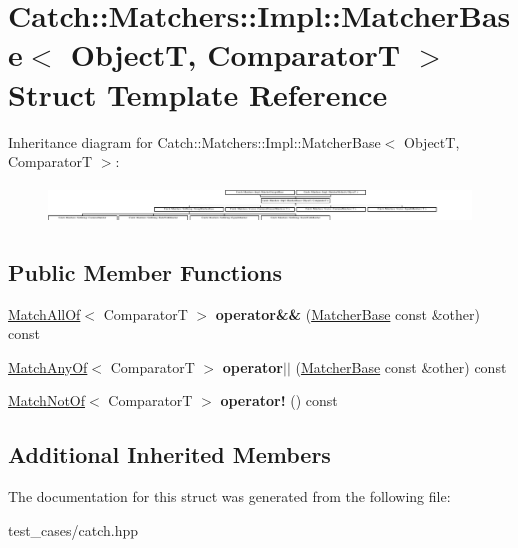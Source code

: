 \hypertarget{structCatch_1_1Matchers_1_1Impl_1_1MatcherBase}{}\section{Catch\+:\+:Matchers\+:\+:Impl\+:\+:Matcher\+Base$<$ ObjectT, ComparatorT $>$ Struct Template Reference}
\label{structCatch_1_1Matchers_1_1Impl_1_1MatcherBase}
Inheritance diagram for Catch\+:\+:Matchers\+:\+:Impl\+:\+:Matcher\+Base$<$ ObjectT, ComparatorT $>$\+:\begin{figure}[H]
\begin{center}
\leavevmode
\includegraphics[height=1.006289cm]{structCatch_1_1Matchers_1_1Impl_1_1MatcherBase}
\end{center}
\end{figure}
\subsection*{Public Member Functions}
\begin{DoxyCompactItemize}
\item 
\mbox{\label{structCatch_1_1Matchers_1_1Impl_1_1MatcherBase_a3deede6b29d20c15cb5efc79df40a520}} 
\hyperlink{structCatch_1_1Matchers_1_1Impl_1_1MatchAllOf}{Match\+All\+Of}$<$ ComparatorT $>$ {\bfseries operator\&\&} (\hyperlink{structCatch_1_1Matchers_1_1Impl_1_1MatcherBase}{Matcher\+Base} const \&other) const
\item 
\mbox{\label{structCatch_1_1Matchers_1_1Impl_1_1MatcherBase_ae0345ee76d109ac6d0241be261450ebc}} 
\hyperlink{structCatch_1_1Matchers_1_1Impl_1_1MatchAnyOf}{Match\+Any\+Of}$<$ ComparatorT $>$ {\bfseries operator$\vert$$\vert$} (\hyperlink{structCatch_1_1Matchers_1_1Impl_1_1MatcherBase}{Matcher\+Base} const \&other) const
\item 
\mbox{\label{structCatch_1_1Matchers_1_1Impl_1_1MatcherBase_a85174b5b27113f7bdc47c140c1c72602}} 
\hyperlink{structCatch_1_1Matchers_1_1Impl_1_1MatchNotOf}{Match\+Not\+Of}$<$ ComparatorT $>$ {\bfseries operator!} () const
\end{DoxyCompactItemize}
\subsection*{Additional Inherited Members}


The documentation for this struct was generated from the following file\+:\begin{DoxyCompactItemize}
\item 
test\+\_\+cases/catch.\+hpp\end{DoxyCompactItemize}
